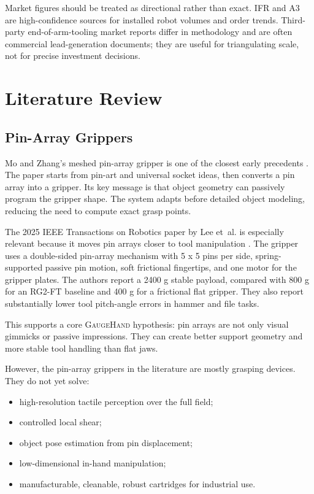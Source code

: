 \documentclass[11pt]{article}
\newcommand{\GaugeHand}{\textsc{GaugeHand}}
\newcommand{\etal}{et~al.}
\begin{document}
Market figures should be treated as directional rather than exact. IFR and A3 are high-confidence sources for installed robot volumes and order trends. Third-party end-of-arm-tooling market reports differ in methodology and are often commercial lead-generation documents; they are useful for triangulating scale, not for precise investment decisions.

\section{Literature Review}

\subsection{Pin-Array Grippers}

Mo and Zhang's meshed pin-array gripper is one of the closest early precedents \cite{mo2019meshed}. The paper starts from pin-art and universal socket ideas, then converts a pin array into a gripper. Its key message is that object geometry can passively program the gripper shape. The system adapts before detailed object modeling, reducing the need to compute exact grasp points.

The 2025 IEEE Transactions on Robotics paper by Lee \etal{} is especially relevant because it moves pin arrays closer to tool manipulation \cite{lee2025frictional}. The gripper uses a double-sided pin-array mechanism with 5 x 5 pins per side, spring-supported passive pin motion, soft frictional fingertips, and one motor for the gripper plates. The authors report a 2400 g stable payload, compared with 800 g for an RG2-FT baseline and 400 g for a frictional flat gripper. They also report substantially lower tool pitch-angle errors in hammer and file tasks.

This supports a core \GaugeHand{} hypothesis: pin arrays are not only visual gimmicks or passive impressions. They can create better support geometry and more stable tool handling than flat jaws.

However, the pin-array grippers in the literature are mostly grasping devices. They do not yet solve:

\begin{itemize}[leftmargin=*]
  \item high-resolution tactile perception over the full field;
  \item controlled local shear;
  \item object pose estimation from pin displacement;
  \item low-dimensional in-hand manipulation;
  \item manufacturable, cleanable, robust cartridges for industrial use.
\end{itemize}
\end{document}
